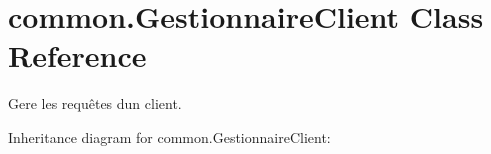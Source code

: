 \hypertarget{classcommon_1_1GestionnaireClient}{}\section{common.\+Gestionnaire\+Client Class Reference}
\label{classcommon_1_1GestionnaireClient}


Gere les requêtes d\textquotesingle{}un client.  




Inheritance diagram for common.\+Gestionnaire\+Client\+:
